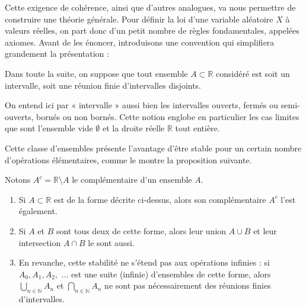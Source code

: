 Cette exigence de cohérence, ainsi que d'autres analogues, va nous permettre de construire une théorie générale. Pour définir la loi d'une variable aléatoire $X$ à valeurs réelles, on part donc d'un petit nombre de règles fondamentales, appelées axiomes. Avant de les énoncer, introduisons une convention qui simplifiera grandement la présentation :

\medskip

\begin{mdframed}
\begin{definition}
Dans toute la suite, on suppose que tout ensemble $A \subset \mathbb{R}$ considéré est soit un intervalle, soit une réunion finie d'intervalles disjoints.
\end{definition}
\end{mdframed}

\begin{remarque}
On entend ici par « intervalle » aussi bien les intervalles ouverts, fermés ou semi-ouverts, bornés ou non bornés. Cette notion englobe en particulier les cas limites que sont l'ensemble vide $\emptyset$ et la droite réelle $\mathbb{R}$ tout entière.
\end{remarque}

Cette classe d'ensembles présente l'avantage d'être stable pour un certain nombre d'opérations élémentaires, comme le montre la proposition suivante.

\medskip

\begin{mdframed}
\begin{proposition}
Notons $A^c = \mathbb{R} \setminus A$ le complémentaire d'un ensemble $A$.

\begin{enumerate}
\item Si $A \subset \mathbb{R}$ est de la forme décrite ci-dessus, alors son complémentaire $A^c$ l'est également.
\item Si $A$ et $B$ sont tous deux de cette forme, alors leur union $A \cup B$ et leur intersection $A \cap B$ le sont aussi.
\item En revanche, cette stabilité ne s'étend pas aux opérations infinies : si $A_0, A_1, A_2,$  $\dots$ est une suite (infinie) d'ensembles de cette forme, alors $\bigcup_{n \in \mathbb{N}} A_n$ et $\bigcap_{n \in \mathbb{N}} A_n$ ne sont pas nécessairement des réunions finies d'intervalles.
\end{enumerate}
\end{proposition}
\end{mdframed}

